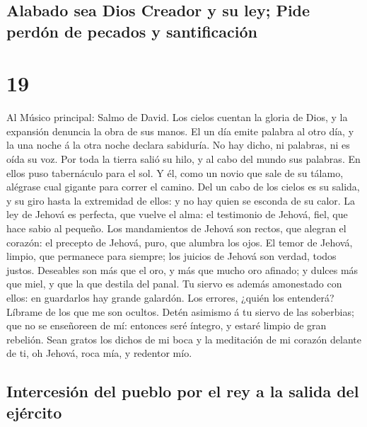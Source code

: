 \hypertarget{alabado-sea-dios-creador-y-su-ley-pide-perduxf3n-de-pecados-y-santificaciuxf3n}{%
\subsection{Alabado sea Dios Creador y su ley; Pide perdón de pecados y
santificación}\label{alabado-sea-dios-creador-y-su-ley-pide-perduxf3n-de-pecados-y-santificaciuxf3n}}

\hypertarget{section-18}{%
\section{19}\label{section-18}}

 Al Músico principal: Salmo de David. Los cielos cuentan
la gloria de Dios, y la expansión denuncia la obra de sus manos.
 El un día emite palabra al otro día, y la una noche á la
otra noche declara sabiduría.  No hay dicho, ni palabras,
ni es oída su voz.  Por toda la tierra salió su hilo, y al
cabo del mundo sus palabras. En ellos puso tabernáculo para el sol.
 Y él, como un novio que sale de su tálamo, alégrase cual
gigante para correr el camino.  Del un cabo de los cielos
es su salida, y su giro hasta la extremidad de ellos: y no hay quien se
esconda de su calor.  La ley de Jehová es perfecta, que
vuelve el alma: el testimonio de Jehová, fiel, que hace sabio al
pequeño.  Los mandamientos de Jehová son rectos, que
alegran el corazón: el precepto de Jehová, puro, que alumbra los ojos.
 El temor de Jehová, limpio, que permanece para siempre;
los juicios de Jehová son verdad, todos justos. 
Deseables son más que el oro, y más que mucho oro afinado; y dulces más
que miel, y que la que destila del panal.  Tu siervo es
además amonestado con ellos: en guardarlos hay grande galardón.
 Los errores, ¿quién los entenderá? Líbrame de los que me
son ocultos.  Detén asimismo á tu siervo de las
soberbias; que no se enseñoreen de mí: entonces seré íntegro, y estaré
limpio de gran rebelión.  Sean gratos los dichos de mi
boca y la meditación de mi corazón delante de ti, oh Jehová, roca mía, y
redentor mío.

\hypertarget{intercesiuxf3n-del-pueblo-por-el-rey-a-la-salida-del-ejuxe9rcito}{%
\subsection{Intercesión del pueblo por el rey a la salida del
ejército}\label{intercesiuxf3n-del-pueblo-por-el-rey-a-la-salida-del-ejuxe9rcito}}

